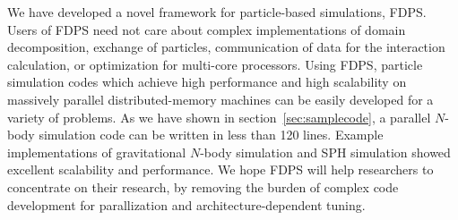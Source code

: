 We have developed a novel framework for particle-based simulations,
FDPS.  Users of FDPS need not care about complex implementations of
domain decomposition, exchange of particles, communication of data for
the interaction calculation, or optimization for multi-core
processors.  Using FDPS, particle simulation codes which achieve high
performance and high scalability on massively parallel
distributed-memory machines can be easily developed for a variety of
problems.  As we have shown in section~\ref{sec:samplecode}, a
parallel $N$-body simulation code can be written in less than 120
lines.  Example implementations of gravitational $N$-body simulation
and SPH simulation showed excellent scalability and performance. We
hope FDPS will help researchers to concentrate on their research, by
removing the burden of complex code development for parallization and
architecture-dependent tuning.


